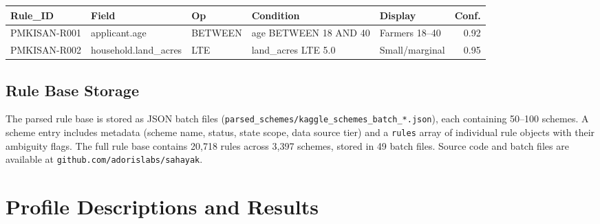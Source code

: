 \documentclass[11pt,a4paper]{article}
\newcommand{\ic}[1]{\texttt{\color{accent}#1}}
\begin{document}
\begin{center}
\footnotesize
\begin{tabular}{@{}lllllr@{}}
\toprule
\textbf{Rule\_ID} & \textbf{Field} & \textbf{Op} & \textbf{Condition} & \textbf{Display} & \textbf{Conf.} \\
\midrule
PMKISAN-R001 & applicant.age & BETWEEN & age BETWEEN 18 AND 40 & Farmers 18--40 & 0.92 \\
PMKISAN-R002 & household.land\_acres & LTE & land\_acres LTE 5.0 & Small/marginal & 0.95 \\
\bottomrule
\end{tabular}
\end{center}

\subsection{Rule Base Storage}

The parsed rule base is stored as JSON batch files (\ic{parsed\_schemes/kaggle\_schemes\_batch\_*.json}), each containing 50--100 schemes. A scheme entry includes metadata (scheme name, status, state scope, data source tier) and a \ic{rules} array of individual rule objects with their ambiguity flags. The full rule base contains 20{,}718 rules across 3{,}397 schemes, stored in 49 batch files. Source code and batch files are available at \ic{github.com/adorislabs/sahayak}.


\section{Profile Descriptions and Results}
\end{document}
